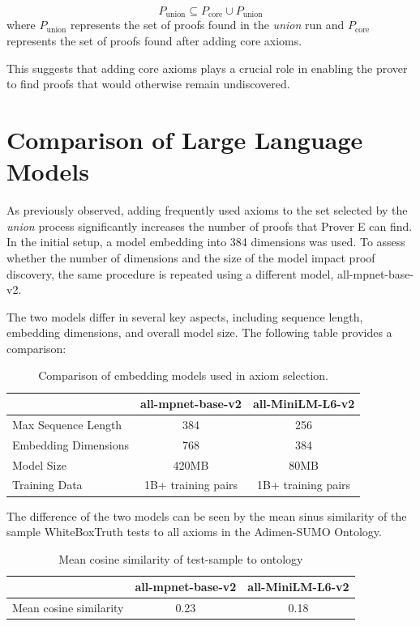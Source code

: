 \documentclass[english,version-2020-11]{uzl-thesis}
\begin{document}
\begin{equation}
    P_{\text{union}} \subseteq P_{\text{core}} \cup P_{\text{union}}
\end{equation}
where \( P_{\text{union}} \) represents the set of proofs found in the \textit{union} run and \( P_{\text{core}} \) represents the set of proofs found after adding core axioms.


This suggests that adding core axioms plays a crucial role in enabling the prover to find proofs that would otherwise remain undiscovered.


\section{Comparison of Large Language Models}

As previously observed, adding frequently used axioms to the set selected by the \textit{union} process significantly increases the number of proofs that Prover E can find. In the initial setup, a model embedding into 384 dimensions was used. To assess whether the number of dimensions and the size of the model impact proof discovery, the same procedure is repeated using a different model, all-mpnet-base-v2.

The two models differ in several key aspects, including sequence length, embedding dimensions, and overall model size. The following table provides a comparison:

\begin{table}[h]
    \centering
    \begin{tabular}{lcc}
        \hline
        & \textbf{all-mpnet-base-v2} & \textbf{all-MiniLM-L6-v2} \\
        \hline
        Max Sequence Length & 384 & 256 \\
        Embedding Dimensions & 768 & 384 \\
        Model Size & 420MB & 80MB \\
        Training Data & 1B+ training pairs & 1B+ training pairs \\
        \hline
    \end{tabular}
    \caption{Comparison of embedding models used in axiom selection.}
    \label{tab:model_comparison}
\end{table}

The difference of the two models can be seen by the mean sinus similarity of the sample WhiteBoxTruth tests to all axioms in the Adimen-SUMO Ontology.


\begin{table}[h]
    \centering
    \begin{tabular}{lcc}
        \hline
        & \textbf{all-mpnet-base-v2} & \textbf{all-MiniLM-L6-v2} \\
        \hline
        Mean cosine similarity & 0.23 & 0.18 \\
        \hline
    \end{tabular}
    \caption{Mean cosine similarity of test-sample to ontology}
    \label{tab:model_comparison_2}
\end{table}
\end{document}
